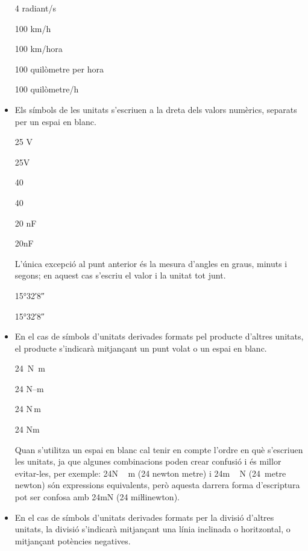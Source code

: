 \begin{itemize}
\textcolor{Red}\faTimesCircle{} 4 radiant/s

\textcolor{Green}\faCheckSquare{} 100 km/h

\textcolor{Red}\faTimesCircle{} 100 km/hora

\textcolor{Green}\faCheckSquare{} 100 quilòmetre per hora

\textcolor{Red}\faTimesCircle{} 100 quilòmetre/h


\item Els símbols de les unitats s'escriuen a la dreta dels valors
numèrics, separats per un espai en blanc.

\textcolor{Green}\faCheckSquare{} 25 V

\textcolor{Red}\faTimesCircle{} 25V

\textcolor{Green}\faCheckSquare{} 40 \celsius

\textcolor{Red}\faTimesCircle{} 40\celsius

\textcolor{Green}\faCheckSquare{} 20 nF

\textcolor{Red}\faTimesCircle{} 20nF


 L'única excepció al punt anterior és la mesura d'angles en graus, minuts i segons; en aquest cas s'escriu el valor i la unitat tot junt.

\textcolor{Green}\faCheckSquare{} \ang{15;32;8}

\textcolor{Red}\faTimesCircle{} \ang[number-angle-product = \,]{15;32;8}

\item En el cas de símbols d'unitats derivades formats pel producte
d'altres unitats, el producte s'indicarà mitjançant un punt volat o
un espai en blanc.

\textcolor{Green}\faCheckSquare{} \SI{24}{N.m}

\textcolor{Red}\faTimesCircle{} 24 N--m

\textcolor{Green}\faCheckSquare{} 24 N\,m

\textcolor{Red}\faTimesCircle{} 24 Nm

Quan s'utilitza un espai en blanc cal tenir en compte  l'ordre en què s'escriuen
les unitats, ja que algunes combinacions poden crear confusió i
és millor evitar-les, per exemple: 24\unit{N\,m} (24 newton metre) i
24\unit{m\,N} (24~metre newton) són expressions equivalents, però
aquesta darrera forma d'escriptura pot ser confosa amb 24\unit{mN} (24 miŀlinewton).

\item En el cas de símbols d'unitats derivades formats per la divisió
d'altres unitats, la divisió s'indicarà mitjançant una línia
inclinada o horitzontal, o mitjançant potències negatives.


\end{itemize}
